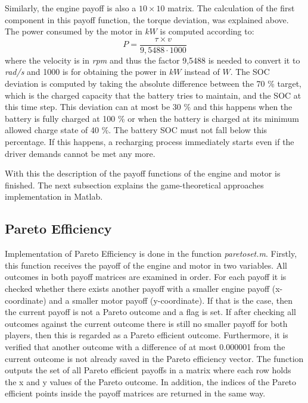 Similarly, the engine payoff is also a $10 \times 10$ matrix. The calculation of the first component in this payoff function, the torque deviation, was explained above. The power consumed by the motor in $kW$ is computed according to:
\begin{equation}
P = \frac{\tau \times v}{9,5488 \cdot 1000}
\end{equation}
where the velocity is in \textit{rpm} and thus the factor 9,5488 is needed to convert it to \textit{rad/s} and 1000 is for obtaining the power in $kW$ instead of $W$. The SOC deviation is computed by taking the absolute difference between the 70 \% target, which is the charged capacity that the battery tries to maintain, and the SOC at this time step. This deviation can at most be 30 \% and this happens when the battery is fully charged at 100 \% or when the battery is charged at its minimum allowed charge state of 40 \%. The battery SOC must not fall below this percentage. If this happens, a recharging process immediately starts even if the driver demands cannot be met any more.

With this the description of the payoff functions of the engine and motor is finished. The next subsection explains the game-theoretical approaches implementation in Matlab.

\subsection{Pareto Efficiency}
Implementation of Pareto Efficiency is done in the function \textit{paretoset.m}. Firstly, this function receives the payoff of the engine and motor in two variables. All outcomes in both payoff matrices are examined in order. For each payoff it is checked whether there exists another payoff with a smaller engine payoff (x-coordinate) and a smaller motor payoff (y-coordinate). If that is the case, then the current payoff is not a Pareto outcome and a flag is set. If after checking all outcomes against the current outcome there is still no smaller payoff for both players, then this is regarded as a Pareto efficient outcome. Furthermore, it is verified that another outcome with a difference of at most 0.000001 from the current outcome is not already saved in the Pareto efficiency vector. The function outputs the set of all Pareto efficient payoffs in a matrix where each row holds the x and y values of the Pareto outcome. In addition, the indices of the Pareto efficient points inside the payoff matrices are returned in the same way.


